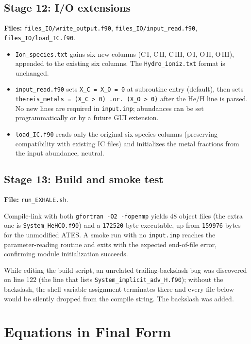 \documentclass[english,a4paper]{my_memo}
\begin{document}
\subsection{Stage 12: I/O extensions}
\textbf{Files:}
\texttt{files\_IO/write\_output.f90},
\texttt{files\_IO/input\_read.f90},
\texttt{files\_IO/load\_IC.f90}.

\begin{itemize}
  \item \texttt{Ion\_species.txt} gains six new columns
    (C\,I, C\,II, C\,III, O\,I, O\,II, O\,III), appended to the
    existing six columns.  The \texttt{Hydro\_ioniz.txt} format is
    unchanged.
  \item \texttt{input\_read.f90} sets \texttt{X\_C = X\_O = 0} at
    subroutine entry (default), then sets
    \texttt{thereis\_metals = (X\_C > 0) .or. (X\_O > 0)} after the
    He/H line is parsed.  No new lines are required in
    \texttt{input.inp}; abundances can be set programmatically or by
    a future GUI extension.
  \item \texttt{load\_IC.f90} reads only the original six species
    columns (preserving compatibility with existing IC files) and
    initializes the metal fractions from the input abundance, neutral.
\end{itemize}

\subsection{Stage 13: Build and smoke test}
\textbf{File:} \texttt{run\_EXHALE.sh}.

Compile-link with both \texttt{gfortran -O2 -fopenmp} yields 48
object files (the extra one is \texttt{System\_HeHCO.f90}) and a
\texttt{172520}-byte executable, up from \texttt{159976} bytes for the
unmodified ATES.  A smoke run with no \texttt{input.inp} reaches the
parameter-reading routine and exits with the expected end-of-file
error, confirming module initialization succeeds.

While editing the build script, an unrelated trailing-backslash bug
was discovered on line 122 (the line that lists
\texttt{System\_implicit\_adv\_H.f90}); without the backslash, the
shell variable assignment terminates there and every file below would
be silently dropped from the compile string.  The backslash was added.

\section{Equations in Final Form}
\end{document}
